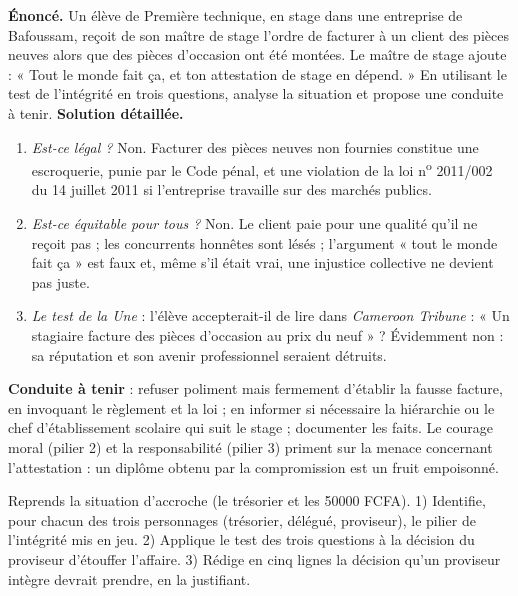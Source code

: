 \documentclass[11pt]{article}
\begin{document}
\begin{exoresolu}
\textbf{Énoncé.} Un élève de Première technique, en stage dans une entreprise de Bafoussam, reçoit de son maître de stage l'ordre de facturer à un client des pièces neuves alors que des pièces d'occasion ont été montées. Le maître de stage ajoute : « Tout le monde fait ça, et ton attestation de stage en dépend. » En utilisant le test de l'intégrité en trois questions, analyse la situation et propose une conduite à tenir.
\tcblower
\textbf{Solution détaillée.}
\begin{enumerate}
\item \emph{Est-ce légal ?} Non. Facturer des pièces neuves non fournies constitue une escroquerie, punie par le Code pénal, et une violation de la loi n\textsuperscript{o} 2011/002 du 14 juillet 2011 si l'entreprise travaille sur des marchés publics.
\item \emph{Est-ce équitable pour tous ?} Non. Le client paie pour une qualité qu'il ne reçoit pas ; les concurrents honnêtes sont lésés ; l'argument « tout le monde fait ça » est faux et, même s'il était vrai, une injustice collective ne devient pas juste.
\item \emph{Le test de la Une} : l'élève accepterait-il de lire dans \emph{Cameroon Tribune} : « Un stagiaire facture des pièces d'occasion au prix du neuf » ? Évidemment non : sa réputation et son avenir professionnel seraient détruits.
\end{enumerate}
\textbf{Conduite à tenir} : refuser poliment mais fermement d'établir la fausse facture, en invoquant le règlement et la loi ; en informer si nécessaire la hiérarchie ou le chef d'établissement scolaire qui suit le stage ; documenter les faits. Le courage moral (pilier 2) et la responsabilité (pilier 3) priment sur la menace concernant l'attestation : un diplôme obtenu par la compromission est un fruit empoisonné.
\end{exoresolu}

\begin{exercice}
Reprends la situation d'accroche (le trésorier et les \num{50000} FCFA). 1) Identifie, pour chacun des trois personnages (trésorier, délégué, proviseur), le pilier de l'intégrité mis en jeu. 2) Applique le test des trois questions à la décision du proviseur d'étouffer l'affaire. 3) Rédige en cinq lignes la décision qu'un proviseur intègre devrait prendre, en la justifiant.
\end{exercice}
\end{document}
